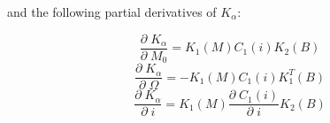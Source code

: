 \documentclass[]{article}
\newcommand{\pd}[2]{\frac{\partial\;#1}{\partial\;#2}}
\begin{document}
	and the following partial derivatives of $K_\alpha$:
	
	\begin{equation*}
		\pd{K_\alpha}{M_0} = K_1(M) C_1(i) K_2(B)
	\end{equation*}
	\begin{equation*}
		\pd{K_\alpha}{\Omega} = -K_1(M) C_1(i) K_1^T(B)
	\end{equation*}
	\begin{equation*}
		\pd{K_\alpha}{i} = K_1(M) \pd{C_1(i)}{i} K_2(B)
	\end{equation*}
	
\end{document}
